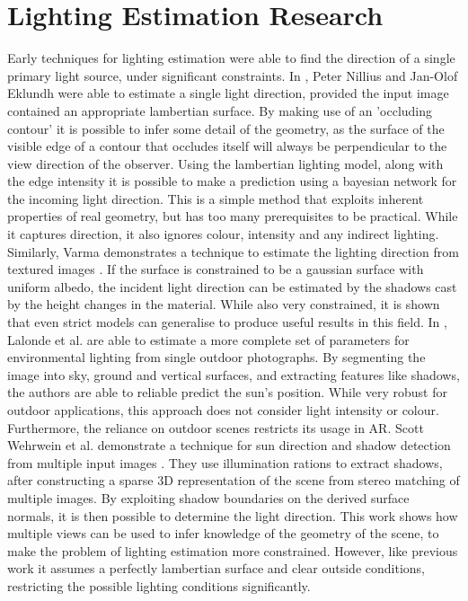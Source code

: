 \documentclass[ %
                    author={Gavin Parker},
                supervisor={Dr. Neill Campbell},
                    degree={MEng},
                     title={Deep Siamese Networks for Illumination Estimation from Stereo Images},
                  subtitle={},
                      type={research},
                      year={2018} ]{dissertation}
\begin{document}
\section{Lighting Estimation Research}
Early techniques for lighting estimation were able to find the direction of a single primary light source, under significant constraints. In \cite{990650}, Peter Nillius and Jan-Olof Eklundh were able to estimate a single light direction, provided the input image contained an appropriate lambertian surface. By making use of an 'occluding contour' it is possible to infer some detail of the geometry, as the surface of the visible edge of a contour that occludes itself will always be perpendicular to the view direction of the observer. Using the lambertian lighting model, along with the edge intensity it is possible to make a prediction using a bayesian network for the incoming light direction. This is a simple method that exploits inherent properties of real geometry, but has too many prerequisites to be practical. While it captures direction, it also ignores colour, intensity and any indirect lighting. Similarly, Varma demonstrates a technique to estimate the lighting direction from textured images \cite{1315030}. If the surface is constrained to be a gaussian surface with uniform albedo, the incident light direction can be estimated by the shadows cast by the height changes in the material. While also very constrained, it is shown that even strict models can generalise to produce useful results in this field.
\newline
In \cite{Lalonde-2009-10350}, Lalonde et al. are able to estimate a more complete set of parameters for environmental lighting from single outdoor photographs. By segmenting the image into sky, ground and vertical surfaces, and extracting features like shadows, the authors are able to reliable predict the sun's position. While very robust for outdoor applications, this approach does not consider light intensity or colour. Furthermore, the reliance on outdoor scenes restricts its usage in AR.
Scott Wehrwein et al. demonstrate a technique for sun direction and shadow detection from multiple input images \cite{7335515}. They use illumination rations to extract shadows, after constructing a sparse 3D representation of the scene from stereo matching of multiple images. By exploiting shadow boundaries on the derived surface normals, it is then possible to determine the light direction. This work shows how multiple views can be used to infer knowledge of the geometry of the scene, to make the problem of lighting estimation more constrained. However, like previous work it assumes a perfectly lambertian surface and clear outside conditions, restricting the possible lighting conditions significantly.
\end{document}
